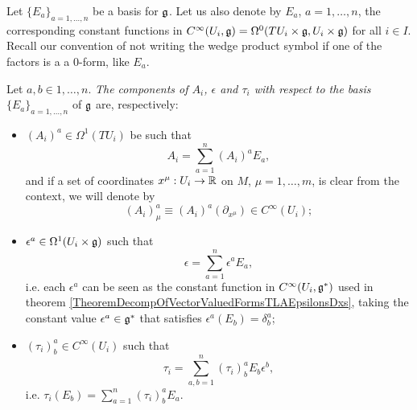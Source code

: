\lin

Let $\{E_a\}_{a = 1, \dots, n}$ be a basis for $\mathfrak{g}$. Let us also denote by $E_a$, $a = 1, \dots, n$, the corresponding constant functions in $C^\infty(U_i, \mathfrak{g}) = \Omega^0(TU_i \times \mathfrak{g}, U_i \times \mathfrak{g})$ for all $i \in I$. Recall our convention of not writing the wedge product symbol if one of the factors is a a $0$-form, like $E_a$.

\begin{definition}
    Let $a, b \in 1, \dots, n$. \emph{The components of $A_i$, $\epsilon$ and $\tau_i$ with respect to the basis $\{E_a\}_{a = 1, \dots, n}$} of $\mathfrak{g}$ are, respectively: 
    
        \begin{itemize}
        
        \item $(A_i)^a \in \Omega^1(TU_i)$ be such that
            \begin{equation}
                A_i = \sum_{a = 1}^n (A_i)^a E_a,
            \end{equation}
        and if a set of coordinates $x^\mu: U_i \to \mathbb{R}$ on $M$, $\mu = 1, \dots, m$, is clear from the context, we will denote by
        \begin{equation}
            (A_i)^a_\mu \equiv (A_i)^a(\partial_{x^\mu}) \in C^\infty(U_i);
        \end{equation}
        
        \item $\epsilon^a \in \Omega^1(U_i \times \alg g)$ such that
            \begin{equation}
                \epsilon = \sum_{a = 1}^n \epsilon^a E_a,
            \end{equation}
        i.e. each $\epsilon^a$ can be seen as the constant function in $C^\infty(U_i, \mathfrak{g}^*)$ used in theorem \ref{TheoremDecompOfVectorValuedFormsTLAEpsilonsDxs}, taking the constant value $\epsilon^a \in \alg g^*$ that satisfies $\epsilon^a(E_b) = \delta^a_b$;
        
        \item $(\tau_i)^a_b \in C^\infty(U_i)$ such that
            \begin{equation}
                \tau_i = \sum_{a, b = 1}^n (\tau_i)^a_b E_b \epsilon^b,
            \end{equation}
        i.e. $\tau_i(E_b) = \sum_{a = 1}^n (\tau_i)^a_b E_a$.
        \end{itemize}
\end{definition}



